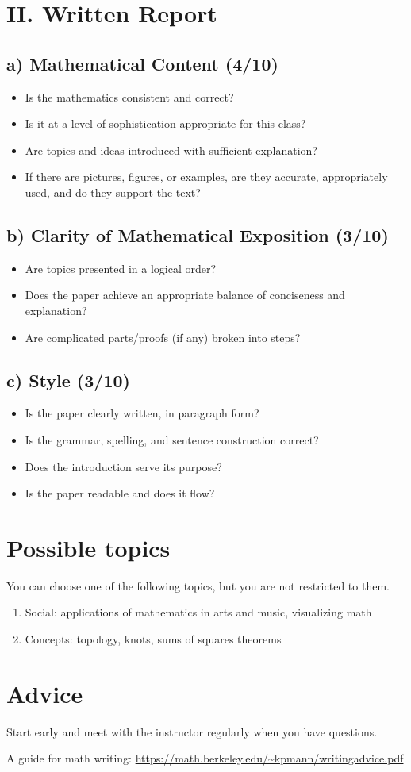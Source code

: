 \documentclass[12pt]{amsart}
\begin{document}
\section*{II. Written Report}

\subsection*{a) Mathematical Content (4/10)}
\begin{itemize}
    \item Is the mathematics consistent and correct?
    \item Is it at a level of sophistication appropriate for this class?
    \item Are topics and ideas introduced with sufficient explanation?
    \item If there are pictures, figures, or examples, are they accurate, appropriately used, and do they support the text?
\end{itemize}

\subsection*{b) Clarity of Mathematical Exposition (3/10)}
\begin{itemize}
    \item Are topics presented in a logical order?
    \item Does the paper achieve an appropriate balance of conciseness and explanation?
    \item Are complicated parts/proofs (if any) broken into steps?
\end{itemize}

\subsection*{c) Style (3/10)}
\begin{itemize}
    \item Is the paper clearly written, in paragraph form?
    \item Is the grammar, spelling, and sentence construction correct?
    \item Does the introduction serve its purpose?
    \item Is the paper readable and does it flow?
\end{itemize}

\section{Possible topics}
You can choose one of the following topics, but you are not restricted to them.
\begin{enumerate}
    \item Social: applications of mathematics in arts and music, visualizing math 
    \item Concepts: topology, knots, sums of squares theorems
\end{enumerate}


\section{Advice}
Start early and meet with the instructor regularly when you have questions.

A guide for math writing:
\url{https://math.berkeley.edu/~kpmann/writingadvice.pdf}

\printbibliography 
%
%
\end{document}
